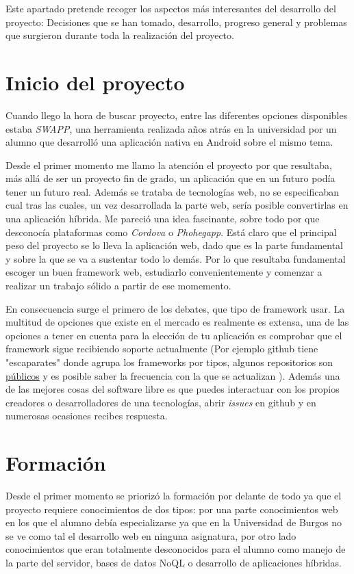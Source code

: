
Este apartado pretende recoger los aspectos más interesantes del desarrollo del proyecto: Decisiones que se han tomado, desarrollo, progreso general y problemas que surgieron durante toda la realización del proyecto.


\section{Inicio del proyecto}\label{inicio-proyecto}
Cuando llego la hora de buscar proyecto, entre las  diferentes opciones disponibles estaba \emph{SWAPP}, una herramienta realizada años atrás en la universidad por un alumno que desarrolló una aplicación nativa en Android sobre el mismo tema.

 Desde el primer momento me llamo la atención el proyecto por que resultaba, más allá de ser un proyecto fin de grado, un aplicación que en un futuro podía tener un futuro real. Además se trataba de tecnologías web, no se especificaban cual tras las cuales, un vez desarrollada la parte web, sería posible convertirlas en una aplicación híbrida. Me pareció una idea fascinante, sobre todo por que desconocía plataformas como \emph{Cordova} o \emph{Phohegapp}. Está claro que el principal peso del proyecto se lo lleva la aplicación web, dado que es la parte fundamental y sobre la que se va a sustentar todo lo demás. Por lo que resultaba fundamental escoger un buen framework web, estudiarlo convenientemente y comenzar a realizar un trabajo sólido a partir de ese momemento.
 
  En consecuencia surge el primero de los debates, que tipo de framework usar. La multitud de opciones que existe en el mercado es realmente es extensa, una de las opciones a tener en cuenta para la elección de tu aplicación es comprobar que el framework sigue recibiendo soporte actualmente (Por ejemplo github tiene "escaparates" donde agrupa los frameworks por tipos, algunos repositorios son \hyperlink{ https://github.com/showcases/web-application-frameworks/}{públicos}  y es posible saber la frecuencia con la que se actualizan ). Además una de las mejores cosas del software libre es que puedes interactuar con los propios creadores  o desarrolladores de una tecnologías, abrir \emph{issues} en github y en numerosas ocasiones recibes respuesta. 
  
  
  \section{Formación}\label{formacion}
Desde el primer momento se priorizó la formación por delante de todo ya que el proyecto requiere conocimientos de dos tipos: por una parte conocimientos web en los que el alumno debía especializarse ya que en la Universidad de Burgos no se ve como tal el desarrollo web en ninguna asignatura, por otro lado conocimientos que eran totalmente desconocidos para el alumno como manejo de la parte del servidor, bases de datos NoQL o desarrollo de aplicaciones híbridas. 

